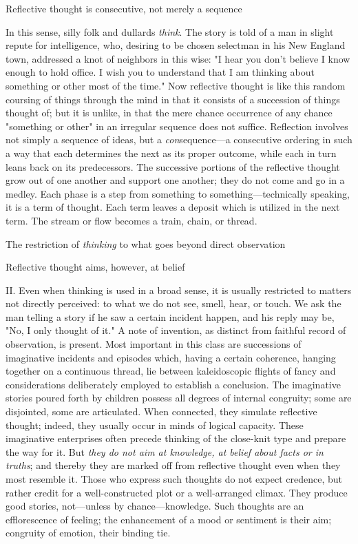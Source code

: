 \documentclass[letterpaper]{book}
\begin{document}
Reflective thought is consecutive, not merely a sequence

In this sense, silly folk and dullards \emph{think}. The story is told
of a man in slight repute for intelligence, who, desiring to be chosen
selectman in his New England town, addressed a knot of neighbors in this
wise: "I hear you don't believe I know enough to hold office. I wish you
to understand that I am thinking about something or other most of the
time." Now reflective thought is like this random coursing of things
through the mind in that it consists of a succession of things thought
of; but it is unlike, in that the mere chance occurrence of any chance
"something or other" in an irregular sequence does not suffice.
Reflection involves not simply a sequence of ideas, but a
\emph{con}sequence---a consecutive ordering in such a way
that
each determines the next as its proper outcome, while each in turn leans
back on its predecessors. The successive portions of the reflective
thought grow out of one another and support one another; they do not
come and go in a medley. Each phase is a step from something to
something---technically speaking, it is a term of thought. Each term
leaves a deposit which is utilized in the next term. The stream or flow
becomes a train, chain, or thread.

The restriction of \emph{thinking} to what goes beyond direct
observation

Reflective thought aims, however, at belief

II. Even when thinking is used in a broad sense, it is usually
restricted to matters not directly perceived: to what we do not see,
smell, hear, or touch. We ask the man telling a story if he saw a
certain incident happen, and his reply may be, "No, I only thought of
it." A note of invention, as distinct from faithful record of
observation, is present. Most important in this class are successions of
imaginative incidents and episodes which, having a certain coherence,
hanging together on a continuous thread, lie between kaleidoscopic
flights of fancy and considerations deliberately employed to establish a
conclusion. The imaginative stories poured forth by children possess all
degrees of internal congruity; some are disjointed, some are
articulated. When connected, they simulate reflective thought; indeed,
they usually occur in minds of logical capacity. These imaginative
enterprises often precede thinking of the close-knit type and prepare
the way for it. But \emph{they do not aim at knowledge, at belief about
facts or in truths}; and thereby they are marked off from reflective
thought even when they most resemble it. Those who express such thoughts
do not expect credence, but rather credit for a well-constructed plot or
a well-arranged climax. They produce good stories, not---unless by
chance---knowledge.
Such thoughts are an efflorescence of feeling; the enhancement of a mood
or sentiment is their aim; congruity of emotion, their binding tie.
\end{document}
